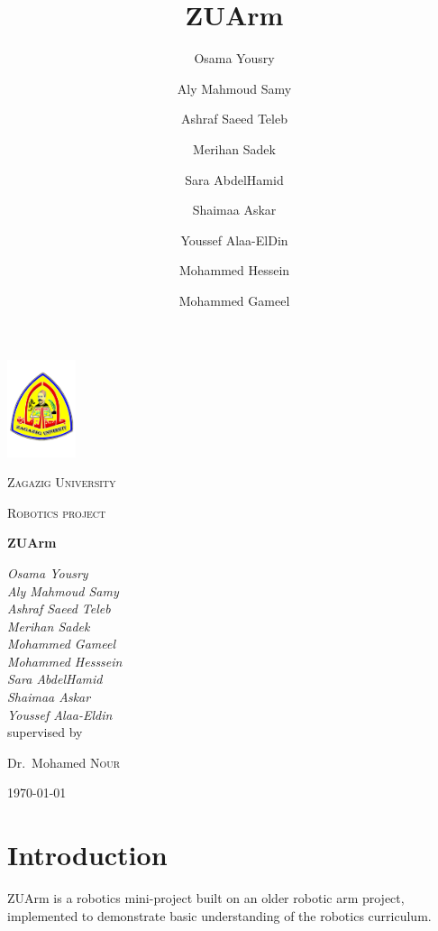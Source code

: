 \documentclass[11pt,a4paper]{report}
\title{ZUArm}
\author{Osama Yousry \and Aly Mahmoud Samy \and Ashraf Saeed Teleb \and Merihan Sadek \and Sara AbdelHamid \and Shaimaa Askar \and Youssef Alaa-ElDin \and Mohammed Hessein \and Mohammed Gameel}
\begin{document}
\begin{titlepage}
	\centering
		\includegraphics[width=0.15\textwidth]{zuLogo.jpg}
\par\vspace{1cm}
	{\scshape\LARGE Zagazig University \par}
	\vspace{1cm}
	{\scshape\Large Robotics project\par}
	\vspace{1.5cm}
	{\huge\bfseries ZUArm\par}
	\vspace{2cm}
	{\itshape Osama Yousry\\
	Aly Mahmoud Samy\\
	Ashraf Saeed Teleb\\
	Merihan Sadek\\
	Mohammed Gameel\\
	Mohammed Hesssein\\
	Sara AbdelHamid\\
	Shaimaa Askar\\
	Youssef Alaa-Eldin\\}
	\vfill
	supervised by\par
	Dr.~Mohamed \textsc{Nour}

	\vfill

	{\large \today\par}
\end{titlepage}
\section{Introduction}
ZUArm is a robotics mini-project built on an older robotic arm project, implemented to demonstrate basic understanding of the robotics curriculum.
\end{document}
